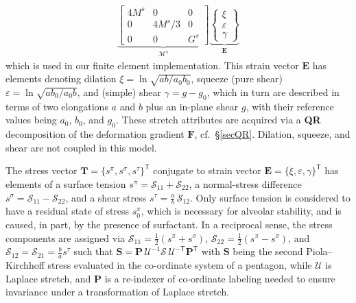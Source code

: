 \begin{subequations}
\begin{align}
    \underbrace{ \begin{bmatrix} 
    4M^s & 0 & 0 \\ 0 & 4M^s/3 & 0 \\ 0 & 0 & G^s 
    \end{bmatrix} }_{\boldsymbol{\mathcal{M}}^s} 
    \underbrace{ \left\{ \begin{matrix} 
    \xi \\ \varepsilon \\ \gamma \end{matrix} 
    \right\} }_{\boldsymbol{E}} 
    \label{pentagonSecantModulus}
    \end{align}
\end{subequations}
which is used in our finite element implementation.  This strain vector $\boldsymbol{E}$ has elements denoting dilation $\xi = \ln\sqrt{ab/a_0b_0}$, squeeze (pure shear) $\varepsilon = \ln\sqrt{ab_0/a_0b}$, and (simple) shear $\gamma = g-g_0$, which in turn are described in terms of two elongations $a$ and $b$ plus an in-plane shear $g$, with their reference values being $a_0$, $b_0$, and $g_0$. These stretch attributes are acquired via a \textbf{QR} decomposition of the deformation gradient $\mathbf{F}$, cf.\ \S\ref{secQR}.    Dilation, squeeze, and shear are not coupled in this model.

The stress vector $\boldsymbol{T} = \{ s^{\pi}, s^{\sigma}, s^{\tau} \}^{\mathsf{T}}$ conjugate to strain vector $\boldsymbol{E} = \{ \xi, \varepsilon, \gamma \}^{\mathsf{T}}$ has elements of a surface tension $s^{\pi} = \mathcal{S}_{11} + \mathcal{S}_{22}$, a normal-stress difference $s^{\sigma} = \mathcal{S}_{11} - \mathcal{S}_{22}$, and a shear stress $s^{\tau} = \tfrac{a}{b} \, \mathcal{S}_{12}$.  Only surface tension is considered to have a residual state of stress $s^{\pi}_0$, which is necessary for alveolar stability, and is caused, in part, by the presence of surfactant.  In a reciprocal sense, the stress components are assigned via $\mathcal{S}_{11} = \frac{1}{2} ( s^{\pi} + s^{\sigma} )$, $\mathcal{S}_{22} = \frac{1}{2} ( s^{\pi} - s^{\sigma} )$, and $\mathcal{S}_{12} = \mathcal{S}_{21} = \frac{b}{a} s^{\tau}$ such that $\mathbf{S} = \mathbf{P} \, \boldsymbol{\mathcal{U}}^{-1} \boldsymbol{\mathcal{S}} \, \boldsymbol{\mathcal{U}}^{-\mathsf{T}} \mathbf{P}^{\mathsf{T}}$ with $\mathbf{S}$ being the second Piola--Kirchhoff stress evaluated in the co-ordinate system of a pentagon, while $\boldsymbol{\mathcal{U}}$ is Laplace stretch, and $\mathbf{P}$ is a re-indexer of co-ordinate labeling needed to ensure invariance under a transformation of Laplace stretch.

